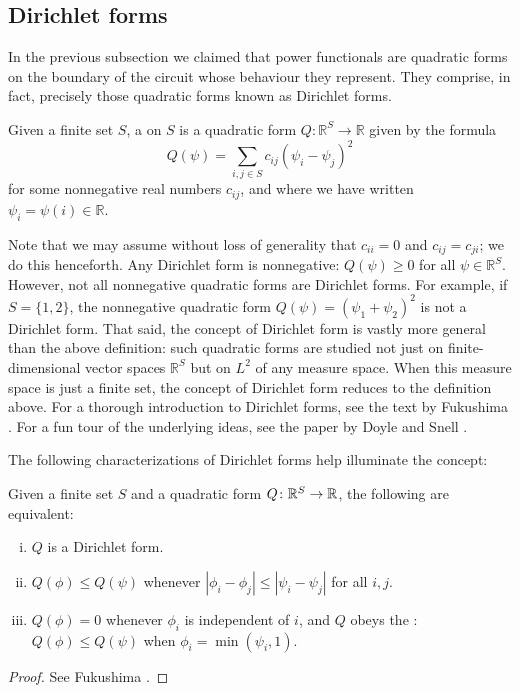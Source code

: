 \subsection{Dirichlet forms}

In the previous subsection we claimed that power functionals are quadratic forms
on the boundary of the circuit whose behaviour they represent. They comprise, in
fact, precisely those quadratic forms known as Dirichlet forms.

\begin{definition}
Given a finite set $S$, a  on $S$ is a quadratic form $Q:
\mathbb{R}^S \to \mathbb{R}$ given by the formula
\[
  Q(\psi) = \sum_{i,j \in S} c_{i j} (\psi_i - \psi_j)^2
\]
for some nonnegative real numbers $c_{i j}$, and where we have written $\psi_i = \psi(i) \in
\mathbb{R}$.
\end{definition}

Note that we may assume without loss of generality that $c_{i i} = 0$ and $c_{i
j} = c_{j i}$; we do this henceforth.  Any Dirichlet form is nonnegative:
$Q(\psi) \ge 0$ for all $\psi \in \mathbb{R}^S$.  However, not all nonnegative
quadratic forms are Dirichlet forms.  For example, if $S = \{1, 2\}$, the
nonnegative quadratic form $Q(\psi) = (\psi_1 + \psi_2)^2$ is not a Dirichlet
form. That said, the concept of Dirichlet form is vastly more general than the
above definition: such quadratic forms are studied not just on
finite-dimensional vector spaces $\mathbb{R}^S$ but on $L^2$ of any measure
space.  When this measure space is just a finite set, the concept of Dirichlet
form reduces to the definition above.  For a thorough introduction to Dirichlet
forms, see the text by Fukushima \cite{Fukushima}.  For a fun tour of the
underlying ideas, see the paper by Doyle and Snell \cite{DS}. 

The following characterizations of Dirichlet forms help illuminate the concept:

\begin{proposition} \label{dirichlet_characterizations}
  Given a finite set $S$ and a quadratic form $Q{\colon} \mathbb{R}^S \to \mathbb{R}$,
  the following are equivalent:
  \begin{enumerate}[(i)]
    \item $Q$ is a Dirichlet form.

    \item $Q(\phi) \le Q(\psi)$ whenever $|\phi_i - \phi_j| \le |\psi_i -
      \psi_j|$ for all $i, j$. 

    \item $Q(\phi) = 0$ whenever $\phi_i$ is independent of $i$, and $Q$ obeys
      the : $Q(\phi) \le Q(\psi)$ when $\phi_i = \min
      (\psi_i, 1) $.
  \end{enumerate}
\end{proposition}
\begin{proof}
See Fukushima \cite{Fukushima}.
\end{proof}

